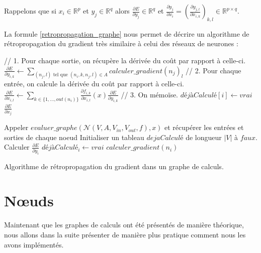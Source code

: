 Rappelons que si $x_i \in \mathbb{R}^p$ et $y_j \in \mathbb{R}^q$ alors $\frac{\partial E}{\partial y_j} \in \mathbb{R}^q$ et $\frac{\partial y_j}{\partial x_i} = (\frac{\partial y_{j,l}}{\partial x_{i, k}})_{k, l} \in \mathbb{R}^{p \times q}$.

La formule \ref{retropropagation_graphe} nous permet de décrire un algorithme de rétropropagation du gradient très similaire à celui des réseaux de neurones :

\begin{algorithm} 
\begin{algorithmic}
		\State // 1. Pour chaque sortie, on récupère la dérivée du coût par rapport à celle-ci.
			\State $\frac{\partial E}{\partial y_{i, k}} \leftarrow \sum\limits_{(n_j, l)\text{ tel que }(n_i, k, n_j, l) \in A}{calculer\_gradient(n_j)_l}$
		\EndFor
		\State // 2. Pour chaque entrée, on calcule la dérivée du coût par rapport à celle-ci.
			\State $\frac{\partial E}{\partial x_{i, l}} \leftarrow \sum\limits_{k \in \{1, ..., out(n_i) \}}{\frac{\partial f_{i, k}}{\partial x_{i, l}}(x)\frac{\partial E}{\partial y_{i, k}}}$
		\EndFor
		\State // 3. On mémoïse.
		\State $déjàCalculé[i] \leftarrow vrai$
	\EndIf
	\State \Return $\frac{\partial E}{\partial x_j}$
\EndFunction

\State Appeler $evaluer\_graphe(\mathcal{N}(V, A, V_{in}, V_{out}, f), x)$ et récupérer les entrées et sorties de chaque noeud
\State Initialiser un tableau $dejaCalculé$ de longueur $|V|$ à $faux$.
	\State Calculer $\frac{\partial E}{\partial y_i}$
	\State $déjàCalculé_i \leftarrow vrai$ 
\EndFor
{}
	\State $calculer\_gradient(n_i)$ 
\EndFor
\EndProcedure
\end{algorithmic} 
\caption{Algorithme de rétropropagation du gradient dans un graphe de calculs.}
\label{propagation_memoisation2}
\end{algorithm}

\section{N\oe{}uds}

\label{comp_graph_part}

Maintenant que les graphes de calculs ont été présentés de manière théorique, nous allons dans la suite présenter de manière plus pratique comment nous les avons implémentés.

